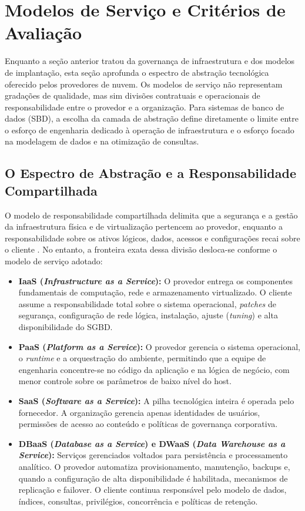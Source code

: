 \documentclass[11pt,a4paper]{article}
\begin{document}
\clearpage

\section{Modelos de Serviço e Critérios de Avaliação}\label{sec:service-evaluation}

Enquanto a seção anterior tratou da governança de infraestrutura e dos modelos de implantação, esta seção aprofunda o espectro de abstração tecnológica oferecido pelos provedores de nuvem. Os modelos de serviço não representam gradações de qualidade, mas sim divisões contratuais e operacionais de responsabilidade entre o provedor e a organização. Para sistemas de banco de dados (SBD), a escolha da camada de abstração define diretamente o limite entre o esforço de engenharia dedicado à operação de infraestrutura e o esforço focado na modelagem de dados e na otimização de consultas.

\subsection{O Espectro de Abstração e a Responsabilidade Compartilhada}

O modelo de responsabilidade compartilhada delimita que a segurança e a gestão da infraestrutura física e de virtualização pertencem ao provedor, enquanto a responsabilidade sobre os ativos lógicos, dados, acessos e configurações recai sobre o cliente \cite{shared}. No entanto, a fronteira exata dessa divisão desloca-se conforme o modelo de serviço adotado:

\begin{itemize}[leftmargin=*]
    \item \textbf{IaaS (\emph{Infrastructure as a Service}):} O provedor entrega os componentes fundamentais de computação, rede e armazenamento virtualizado. O cliente assume a responsabilidade total sobre o sistema operacional, \emph{patches} de segurança, configuração de rede lógica, instalação, ajuste (\emph{tuning}) e alta disponibilidade do SGBD.
    \item \textbf{PaaS (\emph{Platform as a Service}):} O provedor gerencia o sistema operacional, o \emph{runtime} e a orquestração do ambiente, permitindo que a equipe de engenharia concentre-se no código da aplicação e na lógica de negócio, com menor controle sobre os parâmetros de baixo nível do host.
    \item \textbf{SaaS (\emph{Software as a Service}):} A pilha tecnológica inteira é operada pelo fornecedor. A organização gerencia apenas identidades de usuários, permissões de acesso ao conteúdo e políticas de governança corporativa.
    \item \textbf{DBaaS (\emph{Database as a Service}) e DWaaS (\emph{Data Warehouse as a Service}):} Serviços gerenciados voltados para persistência e processamento analítico. O provedor automatiza provisionamento, manutenção, backups e, quando a configuração de alta disponibilidade é habilitada, mecanismos de replicação e failover. O cliente continua responsável pelo modelo de dados, índices, consultas, privilégios, concorrência e políticas de retenção.
\end{itemize}
\end{document}
